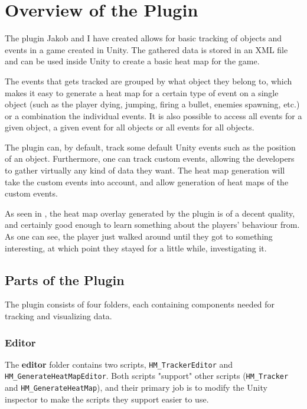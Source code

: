 \section{Overview of the Plugin}
\label{03}

The plugin Jakob and I have created allows for basic tracking of objects and events in a game created in Unity. The gathered data is stored in an XML file and can be used inside Unity to create a basic heat map for the game. 

The events that gets tracked are grouped by what object they belong to, which makes it easy to generate a heat map for a certain type of event on a single object (such as the player dying, jumping, firing a bullet, enemies spawning, etc.) or a combination the individual events. It is also possible to access all events for a given object, a given event for all objects or all events for all objects.

The plugin can, by default, track some default Unity events such as the position of an object. Furthermore, one can track custom events, allowing the developers to gather virtually any kind of data they want. The heat map generation will take the custom events into account, and allow generation of heat maps of the custom events.

As seen in , the heat map overlay generated by the plugin is of a decent quality, and certainly good enough to learn something about the players' behaviour from. As one can see, the player just walked around until they got to something interesting, at which point they stayed for a little while, investigating it.


\subsection{Parts of the Plugin}
\label{03_01}

The plugin consists of four folders, each containing components needed for tracking and visualizing data. 

\subsubsection*{Editor}
\label{03_01_01}

The \textbf{editor} folder contains two scripts, \texttt{HM\_TrackerEditor} and \texttt{HM\_GenerateHeatMapEditor}. Both scripts "support" other scripts (\texttt{HM\_Tracker} and \texttt{HM\_GenerateHeatMap}), and their primary job is to modify the Unity inspector to make the scripts they support easier to use.

